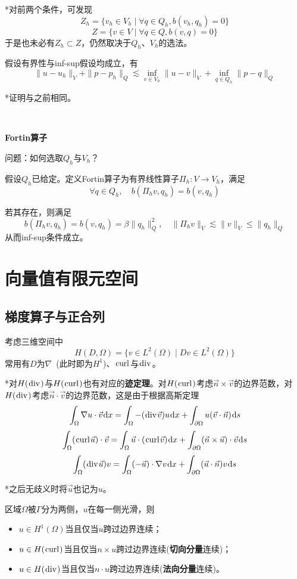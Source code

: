 \documentclass[a4paper,UTF8,fontset=windows]{ctexart}
\newcommand*{\dr}{\hspace{0.07em}\mathrm{d}}
\renewcommand*{\div}{\hspace{0.07em}\mathrm{div}\hspace{0.07em}}
\newcommand*{\curl}{\hspace{0.07em}\mathrm{curl}\hspace{0.07em}}
\begin{document}
*对前两个条件，可发现
$$Z_h=\{v_h\in V_h\mid\forall q\in Q_h,b(v_h,q_h)=0\}$$
$$Z=\{v\in V\mid\forall q\in Q,b(v,q)=0\}$$
于是也未必有$Z_h\subset Z$，仍然取决于$Q_h$、$V_h$的选法。

假设有界性与inf-sup假设均成立，有
$$\|u-u_h\|_V+\|p-p_h\|_Q\lesssim\inf_{v\in V_h}\|u-v\|_V+\inf_{q\in Q_h}\|p-q\|_Q$$

*证明与之前相同。

\

\textbf{Fortin算子}

问题：如何选取$Q_h$与$V_h$？

假设$Q_h$已给定。定义Fortin算子为有界线性算子$\Pi_h:V\to V_h$，满足
$$\forall q\in Q_h,\quad b(\Pi_hv,q_h)=b(v,q_h)$$

若其存在，则满足
$$b(\Pi_hv,q_h)=b(v,q_h)=\beta\|q_h\|_Q^2,\quad\|\Pi_hv\|_V\lesssim\|v\|_V\le\|q_h\|_Q$$
从而inf-sup条件成立。

\section{向量值有限元空间}
\subsection{梯度算子与正合列}
考虑三维空间中
$$H(D,\Omega)=\{v\in L^2(\Omega)\mid Dv\in L^2(\Omega)\}$$
常用有$D$为$\nabla$\ (此时即为$H^1$)、$\curl$与$\div$。

*对$H(\div)$与$H(\curl)$也有对应的\textbf{迹定理}。对$H(\curl)$考虑$\vec{n}\times\vec{v}$的边界范数，对$H(\div)$考虑$\vec{n}\cdot\vec{v}$的边界范数，这是由于根据高斯定理
$$\int_\Omega\nabla u\cdot\vec{v}\dr x=\int_\Omega-(\div\vec{v})u\dr x+\int_{\partial\Omega}u(\vec{v}\cdot\vec{n})\dr s$$
$$\int_\Omega(\curl\vec{u})\cdot\vec{v}=\int_\Omega\vec{u}\cdot(\curl\vec{v})\dr x+\int_{\partial\Omega}(\vec{n}\times\vec{u})\cdot\vec{v}\dr s$$
$$\int_\Omega(\div\vec{u})v=\int_\Omega(-\vec{u})\cdot\nabla v\dr x+\int_{\partial\Omega}(\vec{u}\cdot\vec{n})v\dr s$$

*之后无歧义时将$\vec{u}$也记为$u$。

区域$\Omega$被$\Gamma$分为两侧，$u$在每一侧光滑，则
\begin{itemize}
    \item $u\in H^1(\Omega)$当且仅当$u$跨过边界连续；
    \item $u\in H(\curl)$当且仅当$n\times u$跨过边界连续(\textbf{切向分量}连续)；
    \item $u\in H(\div)$当且仅当$n\cdot u$跨过边界连续(\textbf{法向分量}连续)。
\end{itemize}
\end{document}
